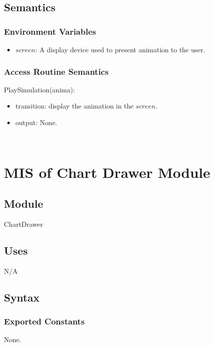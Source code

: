 \documentclass[12pt, titlepage]{article}
\begin{document}
\subsection{Semantics}

\subsubsection{Environment Variables}
\begin{itemize}
\item $screen$: A display device used to present animation to the user. 
\end{itemize}

\subsubsection{Access Routine Semantics}

\noindent PlaySimulation(anima):
\begin{itemize}
\item transition: display the animation in the $screen$.
\item output: None.
\end{itemize}

~\newpage

\section{MIS of Chart Drawer Module} \label{mChart}

\subsection{Module}

ChartDrawer

\subsection{Uses}

N/A

\subsection{Syntax}

\subsubsection{Exported Constants}

None.
\end{document}
